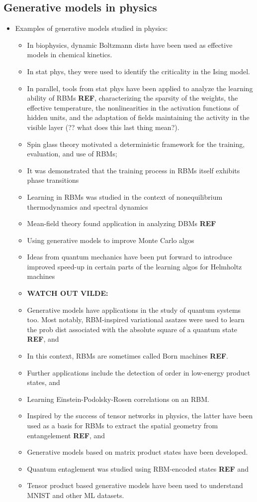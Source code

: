 \documentclass[norsk,a4paper,11pt]{article}
\begin{document}
\subsection{Generative models in physics}
\begin{itemize}
	\item Examples of generative models studied in physics:
	\begin{itemize}
		\item In biophysics, dynamic Boltzmann dists have been used as effective models in chemical kinetics.
		\item In stat phys, they were used to identify the criticality in the Ising model.
		\item In parallel, tools from stat phys have been applied to analyze the learning ability of RBMs \textbf{REF}, characterizing the sparsity of the weights, the effective temperature, the nonlinearities in the activation functions of hidden units, and the adaptation of fields maintaining the activity in the visible layer (?? what does this last thing mean?).
		\item Spin glass theory motivated a deterministic framework for the training, evaluation, and use of RBMs;
		\item It was demonstrated that the training process in RBMs itself exhibits phase transitions
		\item Learning in RBMs was studied in the context of nonequilibrium thermodynamics and spectral dynamics
		\item Mean-field theory found application in analyzing DBMs \textbf{REF}
		\item Using generative models to improve Monte Carlo algos
		\item Ideas from quantum mechanics have been put forward to introduce improved speed-up in certain parts of the learning algos for Helmholtz machines
		\item \textbf{WATCH OUT VILDE:}
		\item Generative models have applications in the study of quantum systems too. Most notably, RBM-inspired variational asatzes were used to learn the prob dist associated with the absolute square of a quantum state \textbf{REF}, and
		\item In this context, RBMs are sometimes called Born machines \textbf{REF}.
		\item Further applications include the detection of order in low-energy product states, and 
		\item Learning Einstein-Podolsky-Rosen correlations on an RBM.
		\item Inspired by the success of tensor networks in physics, the latter have been used as a basis for RBMs to extract the spatial geometry from entangelement \textbf{REF}, and
		\item Generative models based on matrix product states have been developed.
		\item Quantum entaglement was studied using RBM-encoded states \textbf{REF} and
		\item Tensor product based generative models have been used to understand MNIST and other ML datasets.
	\end{itemize}
\end{itemize}
\end{document}
